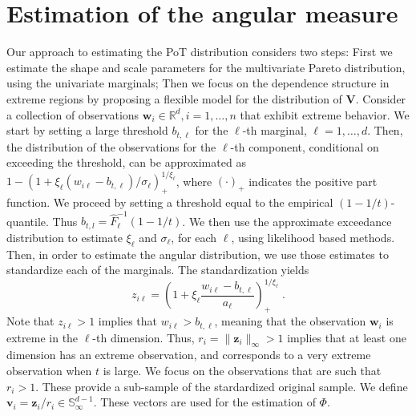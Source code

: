 \section{Estimation of the angular measure\label{sec:methodology}}

Our approach to estimating the PoT distribution considers two steps: First we 
    estimate the shape and scale parameters for the
    multivariate Pareto distribution, using the univariate marginals; Then 
    we focus on the dependence structure in extreme regions by proposing a 
    flexible model for the distribution of $\bm{V}$. Consider a collection of 
    observations  $\bm{w}_i \in {\mathbb R}^d, i = 1, \ldots, n$ that exhibit 
    extreme behavior.  We start by setting a large threshold 
    $b_{t,\ell}$ for the  $\ell$-th marginal, $\ell = 1, \ldots,d$. Then, the 
    distribution of the observations for the $\ell$-th component, 
    conditional on exceeding the threshold, can be 
    approximated as $1 - (1 + \xi_\ell   (w_{i\ell} - b_{t,\ell})/\sigma_\ell)_+^
    {1/\xi_\ell}$, where $(\cdot)_+$ indicates the positive part function.  We 
    proceed by setting a threshold equal to the empirical $(1-1/t)$-quantile. 
    Thus $b_{t,l}  = \hat{F}^{-1}_{\ell}(1 - 1/t)$.  We then use the 
    approximate exceedance distribution to estimate $\xi_\ell$ and $\sigma_\ell$,
    for each $\ell$, using likelihood based methods. Then, in order to estimate 
    the angular distribution, we use those estimates to standardize each of 
    the marginals. The standardization yields
    \begin{equation}
            \label{eqn:standardization}
            z_{i\ell} = \left(1 + \xi_{\ell}\frac{w_{i\ell} -
                b_{t,\ell}}{a_{\ell}}\right)_{+}^{1/\xi_{\ell}}\; .
        \end{equation}
    Note that $z_{i\ell}> 1$ implies that $w_{i\ell} > b_{t,\ell}$, meaning 
    that the observation $\bm{w}_i$ is extreme in the $\ell$-th dimension. 
    Thus, $r_i = \|\bm{z}_i\|_\infty > 1$ implies that at
    least one dimension has an extreme observation, and corresponds 
    to a very extreme observation when $t$ is large. We focus on 
    the observations that are such that $r_i > 1$. These provide a
    sub-sample of the stardardized original sample. We define $\bm{v}_i = 
    \bm{z}_i /r_i \in  \mathbb{S}_{\infty}^{d-1}$. These vectors are used 
    for  the estimation of $\Phi$. 



